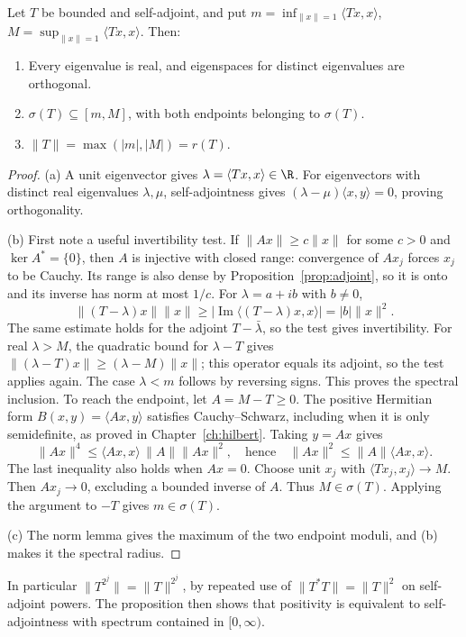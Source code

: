 \begin{proposition}\label{prop:saspec}
Let $T$ be bounded and self-adjoint, and put
$m=\inf_{\|x\|=1}\langle Tx,x\rangle$,
$M=\sup_{\|x\|=1}\langle Tx,x\rangle$.
Then:
\begin{enumerate}
\item[(a)] Every eigenvalue is real, and eigenspaces for distinct eigenvalues are orthogonal.
\item[(b)] $\sigma(T)\subseteq[m,M]$, with both endpoints belonging to $\sigma(T)$.
\item[(c)] $\|T\|=\max(|m|,|M|)=r(T)$.
\end{enumerate}
\end{proposition}
\begin{proof}
(a) A unit eigenvector gives $\lambda=\langle Tx,x\rangle\in\R$. For eigenvectors with distinct real eigenvalues $\lambda,\mu$, self-adjointness gives $(\lambda-\mu)\langle x,y\rangle=0$, proving orthogonality.

(b) First note a useful invertibility test. If $\|Ax\|\ge c\|x\|$ for some $c>0$ and $\ker A^*=\{0\}$, then $A$ is injective with closed range: convergence of $Ax_j$ forces $x_j$ to be Cauchy. Its range is also dense by Proposition~\ref{prop:adjoint}, so it is onto and its inverse has norm at most $1/c$.
For $\lambda=a+ib$ with $b\ne0$,
\[
\|(T-\lambda)x\|\|x\|\ge
|\operatorname{Im}\langle(T-\lambda)x,x\rangle|=|b|\|x\|^2.
\]
The same estimate holds for the adjoint $T-\bar\lambda$, so the test gives invertibility. For real $\lambda>M$, the quadratic bound for $\lambda-T$ gives $\|(\lambda-T)x\|\ge(\lambda-M)\|x\|$; this operator equals its adjoint, so the test applies again. The case $\lambda<m$ follows by reversing signs. This proves the spectral inclusion.
To reach the endpoint, let $A=M-T\ge0$. The positive Hermitian form $B(x,y)=\langle Ax,y\rangle$ satisfies Cauchy--Schwarz, including when it is only semidefinite, as proved in Chapter~\ref{ch:hilbert}. Taking $y=Ax$ gives
\[
\|Ax\|^4\le\langle Ax,x\rangle\,\|A\|\|Ax\|^2,
\quad\text{hence}\quad
\|Ax\|^2\le\|A\|\langle Ax,x\rangle.
\]
The last inequality also holds when $Ax=0$. Choose unit $x_j$ with $\langle Tx_j,x_j\rangle\to M$. Then $Ax_j\to0$, excluding a bounded inverse of $A$. Thus $M\in\sigma(T)$. Applying the argument to $-T$ gives $m\in\sigma(T)$.

(c) The norm lemma gives the maximum of the two endpoint moduli, and (b) makes it the spectral radius.
\end{proof}

In particular $\|T^{2^j}\|=\|T\|^{2^j}$, by repeated use of $\|T^*T\|=\|T\|^2$ on self-adjoint powers. The proposition then shows that positivity is equivalent to self-adjointness with spectrum contained in $[0,\infty)$.

